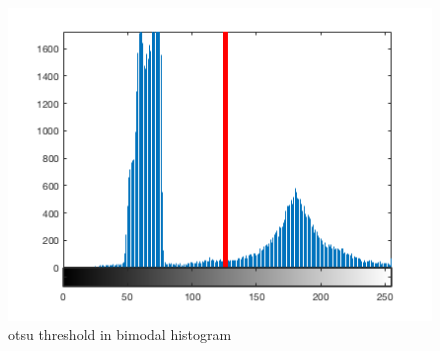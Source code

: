 \documentclass[a4paper,12pt]{article}   %
\numberwithin{equation}{section}        %
\begin{document}
        \begin{figure}[h]
            \includegraphics[width=\linewidth]{otsu_method.png}
            \caption{otsu threshold in bimodal histogram}
            \label{fig:otsu}
        \end{figure}
\end{document}
